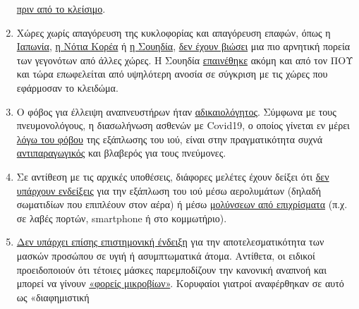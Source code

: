 \begin{enumerate}
  \href{https://www.youtube.com/watch?v=lGC5sGdz4kg}{πριν από το
  κλείσιμο}.
\item
  Χώρες χωρίς απαγόρευση της κυκλοφορίας και απαγόρευση επαφών, όπως η
  \href{https://www.japantimes.co.jp/news/2020/03/20/national/coronavirus-explosion-expected-japan/}{Ιαπωνία},
  \href{https://www.businessinsider.com/south-korea-coronavirus-testing-death-rate-2020-3?op=1}{η
  Νότια Κορέα} ή \href{https://www.youtube.com/watch?v=bfN2JWifLCY}{η
  Σουηδία},
  \href{https://www.washingtontimes.com/news/2020/apr/15/sweden-coronavirus-rates-easing-despite-loose-rule/}{δεν
  έχουν βιώσει} μια πιο αρνητική πορεία των γεγονότων από άλλες χώρες. Η
  Σουηδία
  \href{https://nypost.com/2020/04/29/who-lauds-sweden-as-model-for-resisting-coronavirus-lockdown/}{επαινέθηκε}
  ακόμη και από τον ΠΟΥ και τώρα επωφελείται από υψηλότερη ανοσία σε
  σύγκριση με τις χώρες που εφάρμοσαν το κλειδώμα.
\item
  Ο φόβος για έλλειψη αναπνευστήρων ήταν
  \href{https://apnews.com/8ccd325c2be9bf454c2128dcb7bd616d}{αδικαιολόγητος}.
  Σύμφωνα με τους πνευμονολόγους, η διασωλήνωση ασθενών με Covid19, ο
  οποίος γίνεται εν μέρει
  \href{https://www.dailymail.co.uk/news/article-8262351/Nurse-New-York-claims-city-killing-COVID-19-patients-putting-ventilators.html}{λόγω
  του φόβου} της εξάπλωσης του ιού, είναι στην πραγματικότητα συχνά
  \href{https://www.medscape.com/viewarticle/928156}{αντιπαραγωγικός}
  και βλαβερός για τους πνεύμονες.
\item
  Σε αντίθεση με τις αρχικές υποθέσεις, διάφορες μελέτες έχουν δείξει
  ότι
  \href{https://www.who.int/news-room/commentaries/detail/modes-of-transmission-of-virus-causing-covid-19-implications-for-ipc-precaution-recommendations}{δεν
  υπάρχουν ενδείξεις} για την εξάπλωση του ιού μέσω αερολυμάτων (δηλαδή
  σωματιδίων που επιπλέουν στον αέρα) ή μέσω
  \href{https://www.telegraph.co.uk/news/2020/04/02/no-proof-coronavirus-can-spread-shopping-says-leading-german/}{μολύνσεων
  από επιχρίσματα} (π.χ. σε λαβές πορτών, smartphone ή στο κομμωτήριο).
\item
  \href{https://www.researchgate.net/publication/340570735_Masks_Don't_Work_A_review_of_science_relevant_to_COVID-19_social_policy}{Δεν
  υπάρχει επίσης επιστημονική ένδειξη} για την αποτελεσματικότητα των
  μασκών προσώπου σε υγιή ή ασυμπτωματικά άτομα. Αντίθετα, οι ειδικοί
  προειδοποιούν ότι τέτοιες μάσκες παρεμποδίζουν την κανονική αναπνοή
  και μπορεί να γίνουν
  \href{https://de.sputniknews.com/interviews/20200425326953541-corona-gefahr-virologe/}{«φορείς
  μικροβίων»}. Κορυφαίοι γιατροί αναφέρθηκαν σε αυτό ως «διαφημιστική

\end{enumerate}
